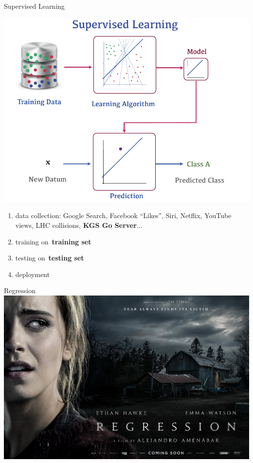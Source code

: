 \documentclass{beamer}
\begin{document}
  {
    \begin{frame}{Supervised Learning}
      \begin{center}
        \includegraphics[height=.6\textheight]{../img/SL_workflow.png}
      \end{center}
      \pause

      \begin{enumerate}[<+- | alert@+>]
          \tiny
        \item data collection: Google Search, Facebook ``Likes'', Siri, Netflix, YouTube views, LHC collisions, \textbf{KGS Go Server}...
        \item training on~\textbf{training set}
        \item testing on~\textbf{testing set}
        \item deployment
      \end{enumerate}
      \pause
    \end{frame}
  }

  \begin{frame}{Regression}
    \pause
    \includegraphics[width=\textwidth]{../img/regression_movie.jpg}
  \end{frame}
\end{document}
